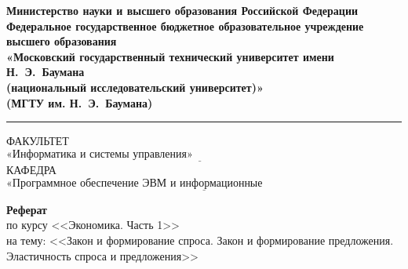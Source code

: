 \documentclass{bmstu}
\begin{document}
	


	\begin{titlepage}
		\fontsize{12pt}{12pt}\selectfont
		\noindent \begin{minipage}{0.15\textwidth}
		\end{minipage}
		\noindent\begin{minipage}{0.9\textwidth}\centering
			\textbf{Министерство науки и высшего образования Российской Федерации}\\
			\textbf{Федеральное государственное бюджетное образовательное учреждение высшего образования}\\
			\textbf{«Московский государственный технический университет имени Н.~Э.~Баумана}\\
			\textbf{(национальный исследовательский университет)»}\\
			\textbf{(МГТУ им. Н.~Э.~Баумана)}
		\end{minipage}
		
		\noindent\rule{18cm}{3pt}
		\newline\newline
		\noindent ФАКУЛЬТЕТ $\underline{\text{«Информатика и системы управления»~~~~~~~~~~~~~~~~~~~~~~~~~~~~~~~~~~~~~~~~~~~~~~~~~~~~~~~}}$ \newline\newline
		\noindent КАФЕДРА $\underline{\text{«Программное обеспечение ЭВМ и информационные технологии»~~~~~~~~~~~~~~~~~~~~~~~}}$\newline\newline\newline\newline\newline\newline\newline
		
		\begin{center}
			\textbf{\large Реферат} \\
			\large по курсу <<Экономика. Часть 1>> \\
			на тему: <<Закон и формирование спроса. Закон и формирование предложения. Эластичность спроса и предложения>>
		\end{center}
		

\end{titlepage}
\end{document}
